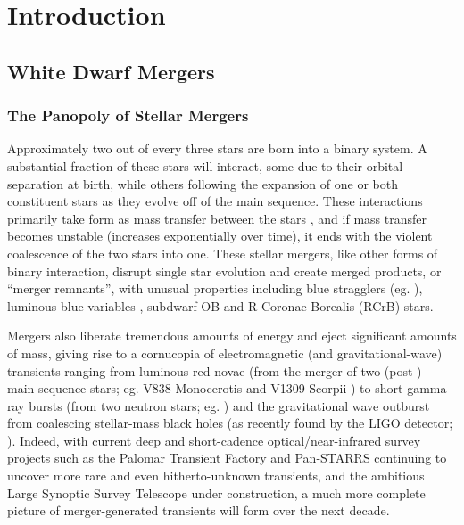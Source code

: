 \chapter{Introduction}

\section{White Dwarf Mergers}
\label{sec:wdmergers}

\subsection{The Panopoly of Stellar Mergers}
\label{ssec:stellarmergers}

Approximately two out of every three stars are born into a binary system.  A substantial fraction of these stars will interact, some due to their orbital separation at birth, while others following the expansion of one or both constituent stars as they evolve off of the main sequence.  These interactions primarily take form as mass transfer between the stars \citep{yung05}, and if mass transfer becomes unstable (increases exponentially over time), it ends with the violent coalescence of the two stars into one.  These stellar mergers, like other forms of binary interaction, disrupt single star evolution and create merged products, or ``merger remnants'', with unusual properties including blue stragglers (eg. \citealt{andrpt06, knigs09}), luminous blue variables \citep{justpv14}, subdwarf OB and R Coronae Borealis (RCrB) stars.

Mergers also liberate tremendous amounts of energy and eject significant amounts of mass, giving rise to a cornucopia of electromagnetic (and gravitational-wave) transients ranging from luminous red novae (from the merger of two (post-) main-sequence stars; eg. V838 Monocerotis and V1309 Scorpii \citep{tyle+11, nandil14}) to short gamma-ray bursts (from two neutron stars; eg. \citealt{ross15}) and the gravitational wave outburst from coalescing stellar-mass black holes (as recently found by the LIGO detector; \citealt{ligo16}).  Indeed, with current deep and short-cadence optical/near-infrared survey projects such as the Palomar Transient Factory \citep{rau+09} and Pan-STARRS \citep{kais+10} continuing to uncover more rare and even hitherto-unknown transients, and the ambitious Large Synoptic Survey Telescope \citep{lsst09} under construction, a much more complete picture of merger-generated transients will form over the next decade.

